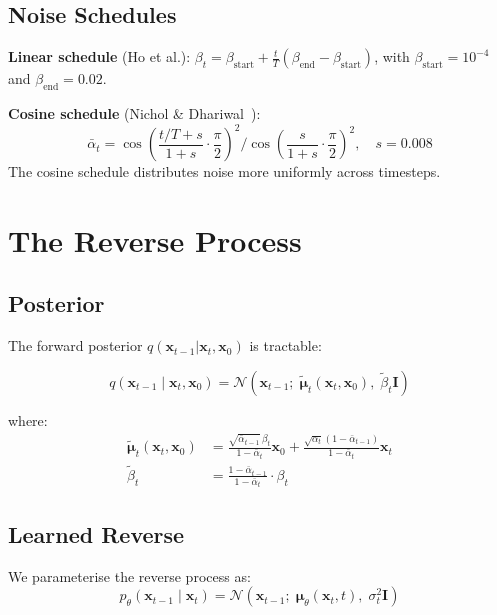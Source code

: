 \documentclass[11pt, a4paper]{article}
\theoremstyle{definition}
\newcommand{\bx}{\bm{x}}
\newcommand{\bmu}{\bm{\mu}}
\newcommand{\bI}{\bm{I}}
\newcommand{\N}{\mathcal{N}}
\newcommand{\abar}{\bar{\alpha}}
\begin{document}
\subsection{Noise Schedules}

\textbf{Linear schedule} (Ho et al.): $\beta_t = \beta_\mathrm{start} +
\frac{t}{T}(\beta_\mathrm{end} - \beta_\mathrm{start})$, with $\beta_\mathrm{start} = 10^{-4}$
and $\beta_\mathrm{end} = 0.02$.

\textbf{Cosine schedule} (Nichol \& Dhariwal~\cite{nichol2021improved}):
\begin{equation}
  \abar_t = \cos\!\left(\frac{t/T + s}{1+s} \cdot \frac{\pi}{2}\right)^2 \bigg/
  \cos\!\left(\frac{s}{1+s}\cdot\frac{\pi}{2}\right)^2, \quad s = 0.008
\end{equation}
The cosine schedule distributes noise more uniformly across timesteps.

\section{The Reverse Process}

\subsection{Posterior}

The forward posterior $q(\bx_{t-1}|\bx_t, \bx_0)$ is tractable:

\begin{equation}
  q(\bx_{t-1}\mid\bx_t, \bx_0) = \N\!\left(\bx_{t-1};\; \tilde{\bmu}_t(\bx_t, \bx_0),\;
  \tilde{\beta}_t\bI\right)
\end{equation}

where:
\begin{align}
  \tilde{\bmu}_t(\bx_t, \bx_0) &= \frac{\sqrt{\abar_{t-1}}\,\beta_t}{1-\abar_t}\bx_0 +
  \frac{\sqrt{\alpha_t}(1-\abar_{t-1})}{1-\abar_t}\bx_t \\
  \tilde{\beta}_t &= \frac{1-\abar_{t-1}}{1-\abar_t}\cdot\beta_t
\end{align}

\subsection{Learned Reverse}

We parameterise the reverse process as:
\begin{equation}
  p_\theta(\bx_{t-1}\mid\bx_t) = \N(\bx_{t-1};\; \bmu_\theta(\bx_t, t),\; \sigma_t^2\bI)
\end{equation}
\end{document}
